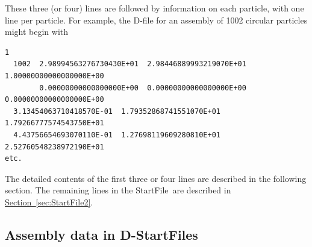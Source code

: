 \documentclass[letterpaper,11pt]{article}
\newcommand{\StartFile}{\textsf{StartFile}}
\begin{document}
%
These three (or four) lines are followed by information on each particle,
with one line per particle. 
For example, the D-file for an assembly of 1002 circular particles
might begin with
\par
\footnotesize
\label{page:dfile}
\begin{verbatim}
1
  1002  2.98994563276730430E+01  2.98446889993219070E+01  1.00000000000000000E+00
        0.00000000000000000E+00  0.00000000000000000E+00  0.00000000000000000E+00
  3.13454063710418570E-01  1.79352868741551070E+01  1.79266777574543750E+01
  4.43756654693070110E-01  1.27698119609280810E+01  2.52760548238972190E+01
etc.
\end{verbatim}
\normalsize
\par
The detailed contents of the first three or four lines are described in
the following section.  The remaining lines in the \StartFile\ are 
described in
\hyperref[sec:StartFile2]{Section~\ref*{sec:StartFile2}}.
%
\subsection{Assembly data in D-\StartFile s}\label{sec:StartFile1}
\end{document}
